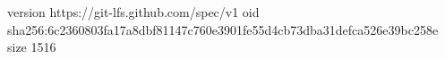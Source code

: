 version https://git-lfs.github.com/spec/v1
oid sha256:6c2360803fa17a8dbf81147c760e3901fe55d4cb73dba31defca526e39bc258e
size 1516

